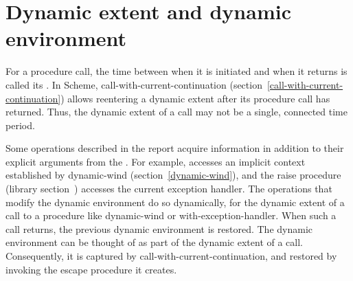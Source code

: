 \section{Dynamic extent and dynamic environment}
\label{dynamicenvironmentsection}

For a procedure call, the time between when it is initiated and when
it returns is called its .  In Scheme, {\cf
  call-with-current-continuation}
(section~\ref{call-with-current-continuation}) allows reentering a
dynamic extent after its procedure call has returned.  Thus, the
dynamic extent of a call may not be a single, connected time period.

Some operations described in the report acquire information in
addition to their explicit arguments from the .  For example, accesses an implicit context established
by {\cf dynamic-wind} (section~\ref{dynamic-wind}), and the {\cf
  raise} procedure (library
section~) accesses the
current exception handler.  The operations that modify the dynamic
environment do so dynamically, for the dynamic extent of a call to a
procedure like {\cf dynamic-wind} or {\cf with-exception-handler}.
When such a call returns, the previous dynamic environment is
restored.  The dynamic environment can be thought of as part of the
dynamic extent of a call.  Consequently, it is captured by {\cf
  call-with-current-continuation}, and restored by invoking the escape
procedure it creates.

